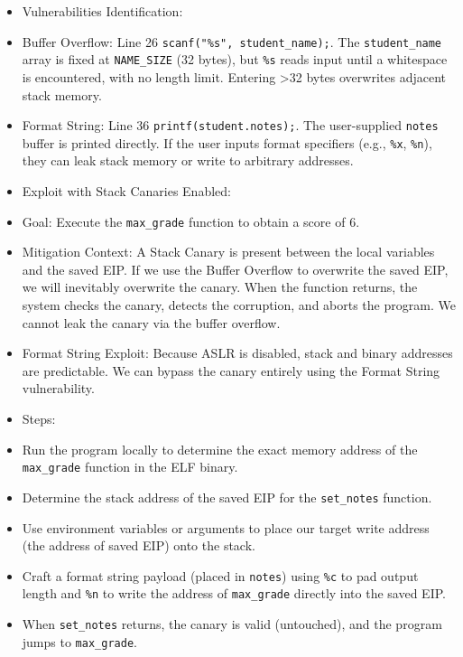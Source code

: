 \documentclass{article}
\begin{document}
\begin{itemize}
    \item[\textbf{1.}] Vulnerabilities Identification:
    \item Buffer Overflow: Line 26 \texttt{scanf("\%s", student\_name);}. The \texttt{student\_name} array is fixed at \texttt{NAME\_SIZE} (32 bytes), but \texttt{\%s} reads input until a whitespace is encountered, with no length limit. Entering >32 bytes overwrites adjacent stack memory.
    \item Format String: Line 36 \texttt{printf(student.notes);}. The user-supplied \texttt{notes} buffer is printed directly. If the user inputs format specifiers (e.g., \texttt{\%x}, \texttt{\%n}), they can leak stack memory or write to arbitrary addresses.

    \item[\textbf{2.}] Exploit with Stack Canaries Enabled:
    \item Goal: Execute the \texttt{max\_grade} function to obtain a score of 6.
    \item Mitigation Context: A Stack Canary is present between the local variables and the saved EIP. If we use the Buffer Overflow to overwrite the saved EIP, we will inevitably overwrite the canary. When the function returns, the system checks the canary, detects the corruption, and aborts the program. We cannot leak the canary via the buffer overflow.
    \item Format String Exploit: Because ASLR is disabled, stack and binary addresses are predictable. We can bypass the canary entirely using the Format String vulnerability.
    \item Steps:
    \item[\textbf{1.}] Run the program locally to determine the exact memory address of the \texttt{max\_grade} function in the ELF binary.
    \item[\textbf{2.}] Determine the stack address of the saved EIP for the \texttt{set\_notes} function.
    \item[\textbf{3.}] Use environment variables or arguments to place our target write address (the address of saved EIP) onto the stack.
    \item[\textbf{4.}] Craft a format string payload (placed in \texttt{notes}) using \texttt{\%c} to pad output length and \texttt{\%n} to write the address of \texttt{max\_grade} directly into the saved EIP.
    \item[\textbf{5.}] When \texttt{set\_notes} returns, the canary is valid (untouched), and the program jumps to \texttt{max\_grade}.
\end{itemize}
\end{document}
